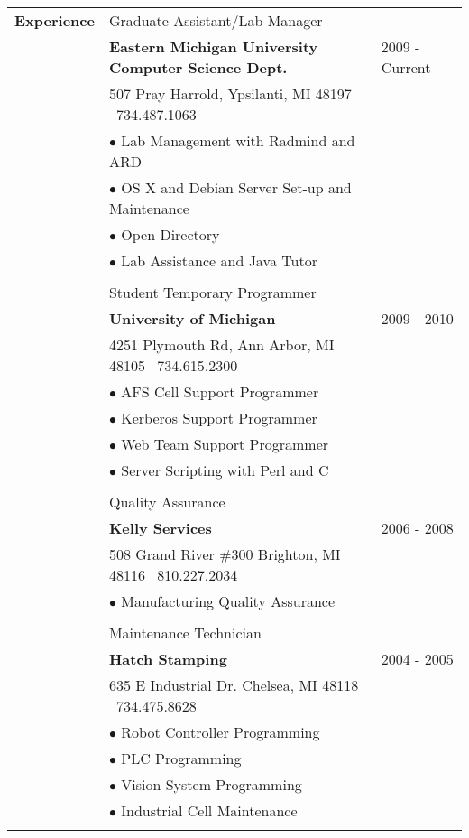 \documentclass[10pt,a4paper]{article}
\begin{document}
\begin{tabular}{ p{} p{} l  }
\textbf{\large Experience} &
Graduate Assistant/Lab Manager & \ \\
\ & \textbf{Eastern Michigan University Computer Science Dept.} & 2009 - Current \\ 
\ & 507 Pray Harrold, Ypsilanti, MI 48197 \ 734.487.1063 & \ \\
\ & $\bullet$ Lab Management with Radmind and ARD & \ \\
\ & $\bullet$ OS X and Debian Server Set-up and Maintenance & \ \\
\ & $\bullet$ Open Directory & \ \\
\ & $\bullet$ Lab Assistance and Java Tutor & \ \\
\\
\ & Student Temporary Programmer & \ \\
\ &\textbf{University of Michigan} & 2009 - 2010 \\
\ & 4251 Plymouth Rd, Ann Arbor, MI 48105  \  734.615.2300 & \ \\
\ & $\bullet$ AFS Cell Support Programmer & \ \\
\ & $\bullet$ Kerberos  Support Programmer & \ \\
\ & $\bullet$ Web Team Support Programmer & \ \\
\ & $\bullet$ Server Scripting with Perl and C & \ \\
\\
\ & Quality Assurance & \ \\
\ &\textbf{Kelly Services} & 2006 - 2008 \\
\ & 508 Grand River \#300 Brighton, MI 48116 \ 810.227.2034 & \ \\
\ & $\bullet$ Manufacturing Quality Assurance & \ \\
\\
\ & Maintenance Technician & \ \\
\ &\textbf{Hatch Stamping} & 2004 - 2005 \\
\ & 635 E Industrial Dr. Chelsea, MI 48118 \  734.475.8628 & \ \\
\ & $\bullet$ Robot Controller Programming & \ \\
\ & $\bullet$ PLC Programming & \ \\
\ & $\bullet$ Vision System Programming & \ \\
\ & $\bullet$ Industrial Cell Maintenance & \ \\
\\
\end{tabular}
\end{document}
